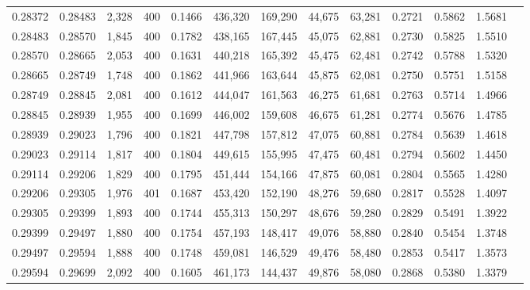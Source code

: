\begin{tabular}{rrrrrrrrrrrrr}
0.28372 & 0.28483 &  2,328 & 400 &                                     0.1466 & 436,320 & 169,290 &  44,675 &  63,281 & 0.2721 & 0.5862 & 1.5681 \\
0.28483 & 0.28570 &  1,845 & 400 &                                     0.1782 & 438,165 & 167,445 &  45,075 &  62,881 & 0.2730 & 0.5825 & 1.5510 \\
0.28570 & 0.28665 &  2,053 & 400 &                                     0.1631 & 440,218 & 165,392 &  45,475 &  62,481 & 0.2742 & 0.5788 & 1.5320 \\
0.28665 & 0.28749 &  1,748 & 400 &                                     0.1862 & 441,966 & 163,644 &  45,875 &  62,081 & 0.2750 & 0.5751 & 1.5158 \\
0.28749 & 0.28845 &  2,081 & 400 &                                     0.1612 & 444,047 & 161,563 &  46,275 &  61,681 & 0.2763 & 0.5714 & 1.4966 \\
0.28845 & 0.28939 &  1,955 & 400 &                                     0.1699 & 446,002 & 159,608 &  46,675 &  61,281 & 0.2774 & 0.5676 & 1.4785 \\
0.28939 & 0.29023 &  1,796 & 400 &                                     0.1821 & 447,798 & 157,812 &  47,075 &  60,881 & 0.2784 & 0.5639 & 1.4618 \\
0.29023 & 0.29114 &  1,817 & 400 &                                     0.1804 & 449,615 & 155,995 &  47,475 &  60,481 & 0.2794 & 0.5602 & 1.4450 \\
0.29114 & 0.29206 &  1,829 & 400 &                                     0.1795 & 451,444 & 154,166 &  47,875 &  60,081 & 0.2804 & 0.5565 & 1.4280 \\
0.29206 & 0.29305 &  1,976 & 401 &                                     0.1687 & 453,420 & 152,190 &  48,276 &  59,680 & 0.2817 & 0.5528 & 1.4097 \\
0.29305 & 0.29399 &  1,893 & 400 &                                     0.1744 & 455,313 & 150,297 &  48,676 &  59,280 & 0.2829 & 0.5491 & 1.3922 \\
0.29399 & 0.29497 &  1,880 & 400 &                                     0.1754 & 457,193 & 148,417 &  49,076 &  58,880 & 0.2840 & 0.5454 & 1.3748 \\
0.29497 & 0.29594 &  1,888 & 400 &                                     0.1748 & 459,081 & 146,529 &  49,476 &  58,480 & 0.2853 & 0.5417 & 1.3573 \\
0.29594 & 0.29699 &  2,092 & 400 &                                     0.1605 & 461,173 & 144,437 &  49,876 &  58,080 & 0.2868 & 0.5380 & 1.3379 \\

\end{tabular}
